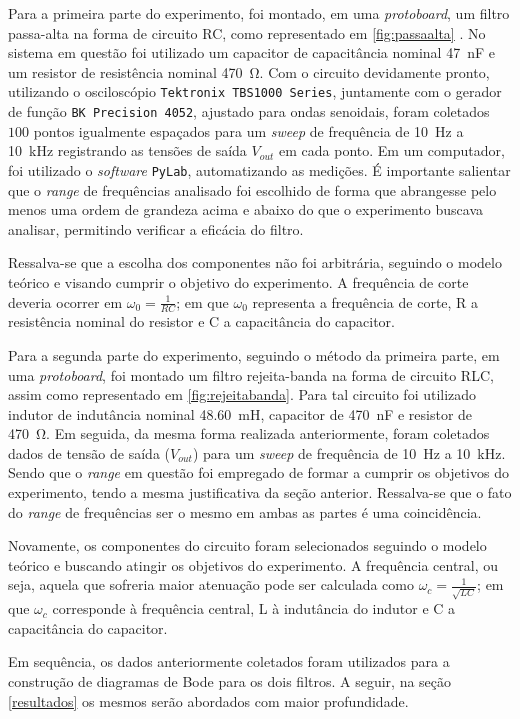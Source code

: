 Para a primeira parte do experimento, foi montado, em uma \textit{protoboard}, um filtro passa-alta na forma de  circuito RC, como representado em \cref{fig:passaalta} . No sistema em questão foi utilizado um capacitor de capacitância nominal \SI{47}{\nano\farad} e um resistor de resistência nominal \SI{470}{\ohm}. Com o circuito devidamente pronto, utilizando o osciloscópio \texttt{Tektronix TBS1000 Series}, juntamente com o gerador de função \texttt{BK Precision 4052}, ajustado para ondas senoidais, foram coletados $100$ pontos igualmente espaçados para um \textit{sweep} de frequência de \SI{10}{\hertz} a \SI{10}{\kilo\hertz} registrando as tensões de saída $V_{out}$ em cada ponto. Em um computador, foi utilizado o \textit{software} \texttt{PyLab}, automatizando as medições. É importante salientar que o \textit{range} de frequências analisado foi escolhido de forma que abrangesse pelo menos uma ordem de grandeza acima e abaixo do que o experimento buscava analisar, permitindo verificar a eficácia do filtro.
\par
Ressalva-se que a escolha dos componentes não foi arbitrária, seguindo o modelo teórico e visando cumprir o objetivo do experimento. A frequência de corte deveria ocorrer em $\omega_0=\frac{1}{RC}$; em que $\omega_0$ representa a frequência de corte, R a resistência nominal do resistor e C a capacitância do capacitor.

\par
Para a segunda parte do experimento, seguindo o método da primeira parte, em uma \textit{protoboard}, foi montado um filtro rejeita-banda na forma de circuito RLC, assim como representado em \ref{fig:rejeitabanda}. Para tal circuito foi utilizado indutor de indutância nominal \SI{48,60}{\milli\henry}, capacitor de \SI{470}{\nano\farad} e resistor de \SI{470}{\ohm}. Em seguida, da mesma forma realizada anteriormente, foram coletados dados de tensão de saída ($V_{out}$) para um \textit{sweep} de frequência de \SI{10}{\hertz} a \SI{10}{\kilo\hertz}. Sendo que o \textit{range} em questão foi empregado de formar a cumprir os objetivos do experimento, tendo a mesma justificativa da seção anterior. Ressalva-se que o fato do \textit{range} de frequências ser o mesmo em ambas as partes é uma coincidência.
\par
Novamente, os componentes do circuito foram selecionados seguindo o modelo teórico e buscando atingir os objetivos do experimento. A frequência central, ou seja, aquela que sofreria maior atenuação pode ser calculada como $\omega_c=\frac{1}{\sqrt{LC}}$; em que $\omega_c$ corresponde à frequência central, L à indutância do indutor e C a capacitância do capacitor.
\par
Em sequência, os dados anteriormente coletados foram utilizados para a construção de diagramas de Bode para os dois filtros. A seguir, na seção \ref{resultados} os mesmos serão abordados com maior profundidade.

